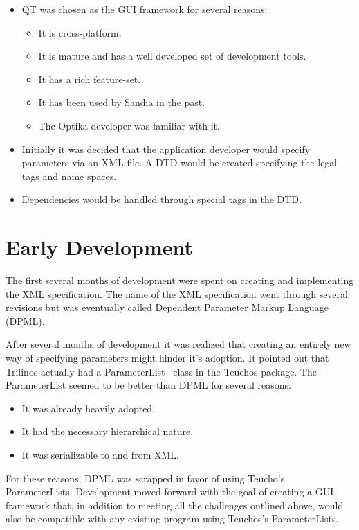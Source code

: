 \begin{itemize}
		\item QT was chosen as the GUI framework for several reasons:
			\begin{itemize}
				\item It is cross-platform.
				\item It is mature and has a well developed set of
				development tools.
				\item It has a rich feature-set.
				\item It has been used by Sandia in the past.
				\item The Optika developer was familiar with it.
			\end{itemize}
		\item Initially it was decided that the application developer would
		specify parameters via an XML file. A DTD would be created specifying
		the legal tags and name spaces.
		\item Dependencies would be handled through special tags in the DTD.
	\end{itemize}

\section{Early Development}
The first several months of development were spent on creating and implementing the XML
specification. The name of the XML specification went through several revisions but was
eventually called Dependent Parameter Markup Language (DPML).

After several months of development it was realized that creating an entirely new way of specifying 
parameters might hinder it's adoption. It pointed out that Trilinos actually had
a ParameterList~\cite{ParameterList} class in the Teuchos package. The ParameterList seemed to be better than DPML for
several reasons:
	\begin{itemize}
		\item It was already heavily adopted.
		\item It had the necessary hierarchical nature.
		\item It was serializable to and from XML.
	\end{itemize}

For these reasons, DPML was scrapped in favor of using Teucho's ParameterLists. Development moved
forward with the goal of creating a GUI framework that, in addition to meeting all the challenges 
outlined above, would also be compatible with any existing program using Teuchos's ParameterLists.

